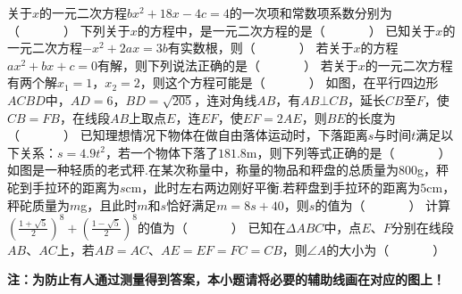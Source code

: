 \documentclass[10pt]{article}
\begin{document}
\showsecret
{}
\informationline
\begin{questions}{\selectingintroduction}
    \question 关于$x$的一元二次方程$bx^{2} + 18x - 4c = 4$的一次项和常数项系数分别为（~~~~~~~）
    \question 下列关于$x$的方程中，是一元二次方程的是（~~~~~~~）
    \question 已知关于$x$的一元二次方程$- x^{2} + 2ax = 3b$有实数根，则（~~~~~~~）
    \question 若关于$x$的方程$ax^{2} + bx + c = 0$有解，则下列说法正确的是（~~~~~~~）
    \question 若关于$x$的一元二次方程有两个解$x_{1} = 1$，$x_{2} = 2$，则这个方程可能是（~~~~~~~）
    \question 如图，在平行四边形$ACBD$中，$AD=6$，$BD=\sqrt{205}$，连对角线$AB$，有$AB \bot CB$，延长$CB$至$F$，使$CB=FB$，在线段$AB$上取点$E$，连$EF$，使$EF=2AE$，则$BE$的长度为（~~~~~~~）
    \question 已知理想情况下物体在做自由落体运动时，下落距离$s$与时间$t$满足以下关系：$s = 4.9t^{2}$，若一个物体下落了$181.8$m，则下列等式正确的是（~~~~~~~）
    \question 如图是一种轻质的老式秤.在某次称量中，称量的物品和秤盘的总质量为$800$g，秤砣到手拉环的距离为$s$cm，此时左右两边刚好平衡.若秤盘到手拉环的距离为$5$cm，秤砣质量为$m$g，且此时$m$和$s$恰好满足$m=8s+40$，则$s$的值为（~~~~~~~）
    \question 计算${\left(\frac{1+\sqrt{5}}{2}\right)^8+\left(\frac{1-\sqrt{5}}{2}\right)^8}$的值为（~~~~~~~）
    \question 已知在$\Delta ABC$中，点$E$、$F$分别在线段$AB$、$AC$上，若$AB = AC$、$AE = EF = FC = CB$，则$\angle A$的大小为（~~~~~~~）
    \par
    \textbf{注：为防止有人通过测量得到答案，本小题请将必要的辅助线画在对应的图上！}
    \begin{figure}[!ht]
        \centering
\end{figure}
\end{questions}
\end{document}
